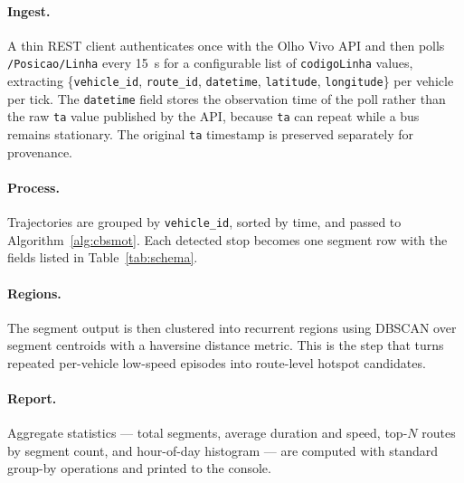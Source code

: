 \documentclass[11pt,a4paper]{article}
\begin{document}
\paragraph{Ingest.}
A thin REST client authenticates once with the Olho Vivo API and then
polls \texttt{/Posicao/Linha} every 15~s for a configurable list of
\texttt{codigoLinha} values, extracting
\{\texttt{vehicle\_id}, \texttt{route\_id}, \texttt{datetime},
\texttt{latitude}, \texttt{longitude}\} per vehicle per tick. The
\texttt{datetime} field stores the observation time of the poll rather
than the raw \texttt{ta} value published by the API, because \texttt{ta}
can repeat while a bus remains stationary. The original \texttt{ta}
timestamp is preserved separately for provenance.

\paragraph{Process.}
Trajectories are grouped by \texttt{vehicle\_id}, sorted by time, and
passed to Algorithm~\ref{alg:cbsmot}. Each detected stop becomes one
segment row with the fields listed in Table~\ref{tab:schema}.

\paragraph{Regions.}
The segment output is then clustered into recurrent regions using DBSCAN
over segment centroids with a haversine distance metric. This is the
step that turns repeated per-vehicle low-speed episodes into route-level
hotspot candidates.

\paragraph{Report.}
Aggregate statistics — total segments, average duration and speed,
top-$N$ routes by segment count, and hour-of-day histogram — are
computed with standard group-by operations and printed to the console.
\end{document}
